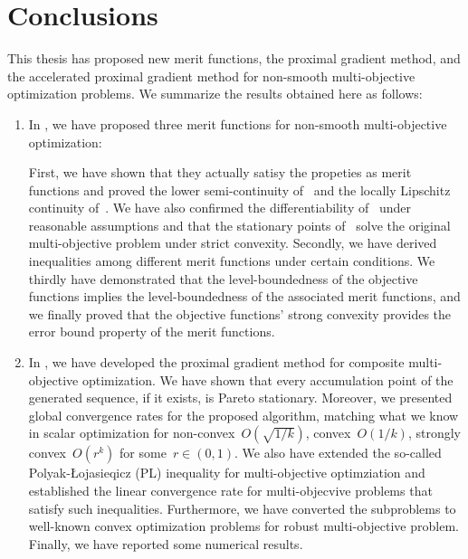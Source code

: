 \documentclass[../main]{subfiles}
\begin{document}
\chapter{Conclusions} 
This thesis has proposed new merit functions, the proximal gradient method, and the accelerated proximal gradient method for non-smooth multi-objective optimization problems.
We summarize the results obtained here as follows:
\begin{enumerate}
    \item In , we have proposed three merit functions for non-smooth multi-objective optimization:
        First, we have shown that they actually satisy the propeties as merit functions and proved the lower semi-continuity of~ and the locally Lipschitz continuity of~.
        We have also confirmed the differentiability of~ under reasonable assumptions and that the stationary points of~ solve the original multi-objective problem under strict convexity.
        Secondly, we have derived inequalities among different merit functions under certain conditions.
        We thirdly have demonstrated that the level-boundedness of the objective functions implies the level-boundedness of the associated merit functions, and we finally proved that the objective functions' strong convexity provides the error bound property of the merit functions.

    \item In , we have developed the proximal gradient method for composite multi-objective optimization.
        We have shown that every accumulation point of the generated sequence, if it exists, is Pareto stationary.
        Moreover, we presented global convergence rates for the proposed algorithm, matching what we know in scalar optimization for non-convex~$O(\sqrt{1 / k})$, convex~$O(1 / k)$, strongly convex~$O(r^k)$ for some~$r \in (0, 1)$.
        We also have extended the so-called Polyak-{\L}ojasieqicz (PL) inequality for multi-objective optimziation and established the linear convergence rate for multi-objecvive problems that satisfy such inequalities.
        Furthermore, we have converted the subproblems to well-known convex optimization problems for robust multi-objective problem.
        Finally, we have reported some numerical results.


\end{enumerate}
\end{document}
